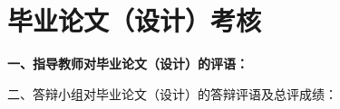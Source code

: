 \chapter*{毕业论文（设计）考核}

{
    \bfseries
    \noindent 一、指导教师对毕业论文（设计）的评语：\\
    \vskip 50mm

    \signature{指导教师（签名）}

    \noindent 二、答辩小组对毕业论文（设计）的答辩评语及总评成绩：\\

    \mbox{} \vfill

    \finaleval[0][0][0][0][0]

    \signature{负责人（签名）}
}
